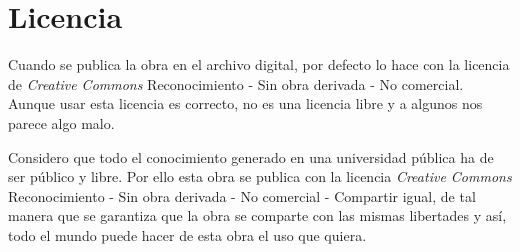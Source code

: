 \chapter{Licencia}
\label{ch:licencia}

Cuando se publica la obra en el archivo digital, por defecto lo hace con la licencia de \textit{Creative Commons} Reconocimiento - Sin obra derivada - No comercial. Aunque usar esta licencia es correcto, no es una licencia libre y a algunos nos parece algo malo.

Considero que todo el conocimiento generado en una universidad pública ha de ser público y libre. Por ello esta obra se publica con la licencia \textit{Creative Commons} Reconocimiento - Sin obra derivada - No comercial - Compartir igual, de tal manera que se garantiza que la obra se comparte con las mismas libertades y así, todo el mundo puede hacer de esta obra el uso que quiera.